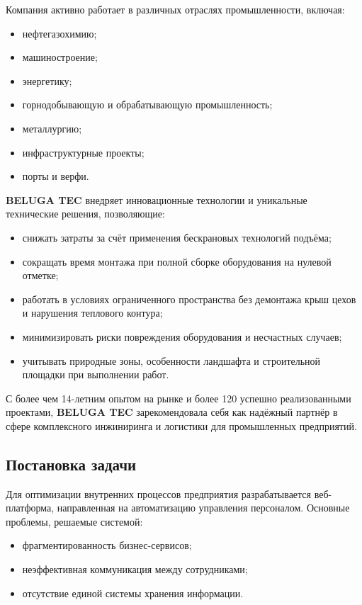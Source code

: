 Компания активно работает в различных отраслях промышленности, включая:

\begin{itemize}
  \item нефтегазохимию;
  \item машиностроение;
  \item энергетику;
  \item горнодобывающую и обрабатывающую промышленность;
  \item металлургию;
  \item инфраструктурные проекты;
  \item порты и верфи.
\end{itemize}

\textbf{BELUGA TEC} внедряет инновационные технологии и уникальные технические решения, позволяющие:

\begin{itemize}
  \item снижать затраты за счёт применения бескрановых технологий подъёма;
  \item сокращать время монтажа при полной сборке оборудования на нулевой отметке;
  \item работать в условиях ограниченного пространства без демонтажа крыш цехов и нарушения теплового контура;
  \item минимизировать риски повреждения оборудования и несчастных случаев;
  \item учитывать природные зоны, особенности ландшафта и строительной площадки при выполнении работ.
\end{itemize}

С более чем 14-летним опытом на рынке и более 120 успешно реализованными проектами, \textbf{BELUGA TEC} зарекомендовала себя как надёжный партнёр в сфере комплексного инжиниринга и логистики для промышленных предприятий.


\subsection{Постановка задачи}

Для оптимизации внутренних процессов предприятия разрабатывается веб-платформа, направленная на автоматизацию управления персоналом. Основные проблемы, решаемые системой:

\begin{itemize}
  \item фрагментированность бизнес-сервисов;
  \item неэффективная коммуникация между сотрудниками;
  \item отсутствие единой системы хранения информации.
\end{itemize}

